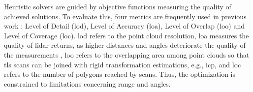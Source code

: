 Heuristic solvers are guided by objective functions measuring the quality of achieved solutions. To evaluate this, four metrics are frequently used in previous work \cite{li_3d_2022, aryan_planning_2021}: Level of Detail (\acrshort{lod}), Level of Accuracy (\acrshort{loa}), Level of Overlap (\acrshort{loo}) and Level of Coverage (\acrshort{loc}). \acrshort{lod} refers to the point cloud resolution, \acrshort{loa} measures the quality of \acrshort{lidar} returns, as higher distances and angles deteriorate the quality of the measurements \cite{ aryan_planning_2021}, \acrshort{loo} refers to the overlapping area among point clouds so that \acrshort{tls} scans can be joined with rigid transformation estimations, e.g., \acrshort{icp}, and \acrshort{loc} refers to the number of polygons reached by scans. Thus, the optimization is constrained to limitations concerning range and angles. 

